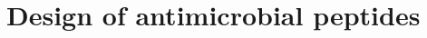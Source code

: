 \chapter{Design of antimicrobial peptides}\label{chapter:amps}
\begin{comment}
\section{Introduction}
    In the previous chapter, I introduced grammars as a generalized
    method for modeling motifs in sequences of characters.  In
    addition, I presented a detailed look at the Teiresias motif
    discovery tool.  In this, the second chapter of my thesis, I
    show how Teiresias can be used to derive sets of regular
    grammars describing a particular class of protein sequences ---
    antimicrobial peptides.  In what follows, I present a general
    background on antimicrobial peptides and then provide a
    rationale for why these peptides are particularly well--suited
    for being modeled using regular grammars.  I detail the
    construction of an annotation tool for finding new antimicrobial
    peptides and validating the general hypothesis that regular
    grammars can be used as a sensitive and specific indicator of
    antimicrobial function in peptide sequences.  Next, I describe
    the preliminary design of synthetic antimicrobial peptides using
    an evolutionary approach, which, although ultimately inconclusive, provided
    motivation for a more focused design.  The final section of this
    chapter describes a more focused design approach, detailing the
    successful construction of numerous novel peptides with strong
    antimicrobial activity against a wide spectrum of bacteria.

    The research described in this chapter is drawn
    largely from a publication that is in preparation
    in collaboration with Christopher Loose, Isidore
    Rigoutsos, and Gregory Stephanopoulos.  (Some
    experimental work in Section~\vref{section:preliminary}
    was also performed by Gyoo Yeol Jung.)  Throughout this
    chapter, the use of the pronoun ``we'' refers to this
    group of authors.

\section{Motivation}
    Antimicrobial peptides are small
    proteins that attack and kill microbes.
    These peptides are effectors of the
    innate immune system: the phylogenetically
    ancient first line of defense against pathogen
    assault~\cite{rolff2003invertebrate,kimbrell2001evolution}.
    Antimicrobial peptides are ubiquitous
    amongst multicellular eukaryotes and
    found in diverse contexts including frog
    skin~\cite{simmaco1999antimicrobial}, scorpion
    venom~\cite{moerman2002antibacterial}, and human
    sweat~\cite{schittek2001dermcidin}.


\end{comment}
